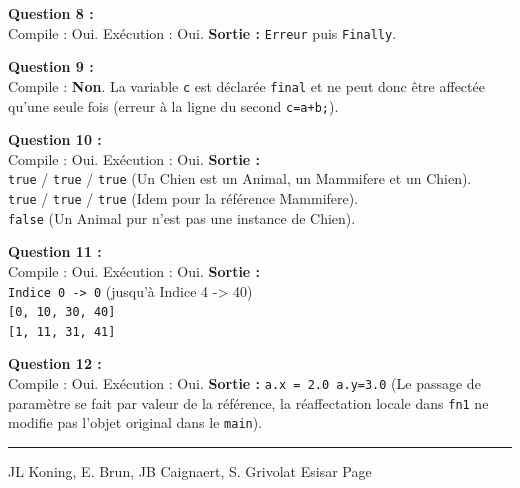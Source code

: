 \documentclass[11pt, a4paper]{article}
\begin{document}
{\vspace{0.1cm}
\textbf{Question 8 :}\\
Compile : Oui. Exécution : Oui. \textbf{Sortie :} \texttt{Erreur} puis \texttt{Finally}.

\vspace{0.1cm}
\textbf{Question 9 :}\\
Compile : \textbf{Non}. La variable \texttt{c} est déclarée \texttt{final} et ne peut donc être affectée qu'une seule fois (erreur à la ligne du second \texttt{c=a+b;}).

\vspace{0.1cm}
\textbf{Question 10 :}\\
Compile : Oui. Exécution : Oui. \textbf{Sortie :}\\
\texttt{true} / \texttt{true} / \texttt{true} (Un Chien est un Animal, un Mammifere et un Chien).\\
\texttt{true} / \texttt{true} / \texttt{true} (Idem pour la référence Mammifere).\\
\texttt{false} (Un Animal pur n'est pas une instance de Chien).

\vspace{0.1cm}
\textbf{Question 11 :}\\
Compile : Oui. Exécution : Oui. \textbf{Sortie :}\\
\texttt{Indice 0 -> 0} (jusqu'à Indice 4 -> 40)\\
\texttt{[0, 10, 30, 40]}\\
\texttt{[1, 11, 31, 41]}

\vspace{0.1cm}
\textbf{Question 12 :}\\
Compile : Oui. Exécution : Oui. \textbf{Sortie :} \texttt{a.x = 2.0 a.y=3.0} (Le passage de paramètre se fait par valeur de la référence, la réaffectation locale dans \texttt{fn1} ne modifie pas l'objet original dans le \texttt{main}).
}

\vfill
\hrule
\vspace{0.1cm}
\noindent
JL Koning, E. Brun, JB Caignaert, S. Grivolat \hfill Esisar \hfill Page \thepage
\end{document}
